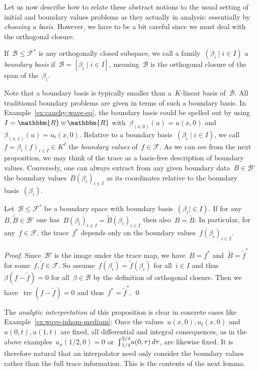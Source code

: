\documentclass[a4paper]{llncs}
\let\mathbb\mathbbm
\newcommand{\RR}{\mathbb{R}}
\newcommand{\cum}{{\textstyle \varint}}
\newcommand{\trc}{\operatorname{trc}}
\newcommand{\galg}{\mathcal{F}}
\newcommand{\bspc}{\mathcal{B}}
\newenvironment{myproof}{\begin{proof}}{\qed\end{proof}}
\begin{document}
Let us now describe how to relate these abstract notions to the usual
setting of initial and boundary values problems as they actually in
analysis: essentially by \emph{choosing a basis}. However, we have to
be a bit careful since we must deal with the orthogonal closure.

\begin{mydefinition}
  \label{def:boundary-basis}
  If~$\bspc \le \galg^*$ is any orthogonally closed subspace, we call a
  family~$(\beta_i \mid i \in I)$ a \emph{boundary basis} if~$\bspc = [\beta_i
  \mid i \in I]$, meaning~$\bspc$ is the orthogonal closure of the span of
  the~$\beta_i$.
\end{mydefinition}

Note that a boundary basis is typically smaller than a~$K$-linear
basis of~$\bspc$. All traditional boundary problems are given in terms
of such a boundary basis. In Example~\ref{ex:cauchy-wave-eq}, the
boundary basis could be spelled out by using~$I = \RR \uplus \RR$
with~$\beta_{(x,0)}(u) = u(x,0)$ and~$\beta_{(x,1)}(u) =
u_t(x,0)$. Relative to a boundary basis~$(\beta_i \mid i \in I)$, we
call~$f = \beta_i(f)_{i \in I} \in K^I$ the \emph{boundary values}
of~$f \in \galg$. As we can see from the next proposition, we
may think of the trace as a basis-free description of boundary
values. Conversely, one can always extract from any given boundary
data~$B \in \bspc'$ the boundary values~$B(\beta_i)_{i \in I}$ as its
coordinates relative to the boundary basis~$(\beta_i)$.

\begin{mylemma}
  \label{lem:trc-coord}
  Let~$\bspc \le \galg^*$ be a boundary space with boundary
  basis~$(\beta_i \mid \in I)$. If for any~$B, \tilde{B} \in \bspc'$
  one has~$B(\beta_i)_{i \in I} = \tilde{B}(\beta_i)_{i \in I}$ then
  also~$B = \tilde{B}$. In particular, for any~$f \in \galg$,
  the trace~$f^*$ depends only on the boundary values~$f(\beta_i)_{i
    \in I}$.
\end{mylemma}
\begin{myproof}
  Since~$\bspc'$ is the image under the trace map, we have~$B = f^*$
  and~$\tilde{B} = \tilde{f}^*$ for some~$f, \tilde{f} \in \galg$. So
  assume~$f(\beta_i) = \tilde{f}(\beta_i)$ for all~$i \in I$ and
  thus~$\beta(f-\tilde{f}) = 0$ for all~$\beta \in \bspc$ by the definition of
  orthogonal closure. Then we have~$\trc(f-\tilde{f}) = 0$ and thus~$f^* =
  \tilde{f}^*$.
\end{myproof}

The \emph{analytic interpretation} of this proposition is clear in
concrete cases like Example~\ref{ex:wave-inhom-medium}: Once the
values~$u(x,0), u_t(x,0)$ and~$u(0,t), u(1,t)$ are fixed, all
differential and integral consequences, as in the above
examples~$u_x(1/2,0) = 0$ or~$\cum_{1/4}^{3/4} u(0,\tau) \, d\tau$,
are likewise fixed. It is therefore natural that an interpolator need
only consider the boundary values rather than the full trace
information. This is the contents of the next lemma.
\end{document}
